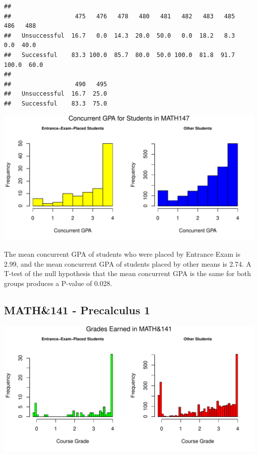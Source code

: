 \documentclass[twoside]{article}\usepackage[]{graphicx}\usepackage[]{color}
\makeatletter
\def\maxwidth{ %
  \ifdim\Gin@nat@width>\linewidth
    \linewidth
  \else
    \Gin@nat@width
  \fi
}
\newenvironment{kframe}{%
 \def\at@end@of@kframe{}%
 \ifinner\ifhmode%
  \def\at@end@of@kframe{\end{minipage}}%
  \begin{minipage}{\columnwidth}%
 \fi\fi%
 \def\FrameCommand##1{\hskip\@totalleftmargin \hskip-\fboxsep
 \colorbox{shadecolor}{##1}\hskip-\fboxsep
     \hskip-\linewidth \hskip-\@totalleftmargin \hskip\columnwidth}%
 \MakeFramed {\advance\hsize-\width
   \@totalleftmargin\z@ \linewidth\hsize
   \@setminipage}}%
 {\par\unskip\endMakeFramed%
 \at@end@of@kframe}
\newenvironment{knitrout}{}{} %
\makeatother
\begin{document}
\begin{knitrout}
\color{fgcolor}\begin{kframe}
\begin{verbatim}
##               
##                  475   476   478   480   481   482   483   485   486   488
##   Unsuccessful  16.7   0.0  14.3  20.0  50.0   0.0  18.2   8.3   0.0  40.0
##   Successful    83.3 100.0  85.7  80.0  50.0 100.0  81.8  91.7 100.0  60.0
##               
##                  490   495
##   Unsuccessful  16.7  25.0
##   Successful    83.3  75.0
\end{verbatim}
\end{kframe}
\end{knitrout}


\begin{knitrout}
\color{fgcolor}
\includegraphics[width=\maxwidth]{figure/GPAgraphs147-1} 

\end{knitrout}

The mean concurrent GPA of students who were placed by Entrance Exam is 2.99, and the mean concurrent GPA of students placed by other means is 2.74.  A T-test of the null hypothesis that the mean concurrent GPA is the same for both groups produces a P-value of 0.028.


\newpage
\subsection{MATH\&141 - Precalculus 1}

\begin{knitrout}
\color{fgcolor}
\includegraphics[width=\maxwidth]{figure/graphs141-1} 

\end{knitrout}
\end{document}
